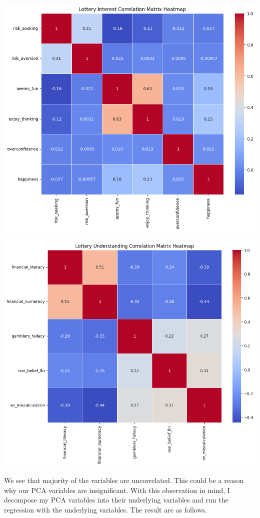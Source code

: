 \documentclass[
  12pt]{article}
\begin{document}
\includegraphics{images/20.png}

\includegraphics{images/21.png}

We see that majority of the variables are uncorrelated. This could be a
reason why our PCA variables are insignificant. With this observation in
mind, I decompose my PCA variables into their underlying variables and
run the regression with the underlying variables. The result are as
follows.
\end{document}
